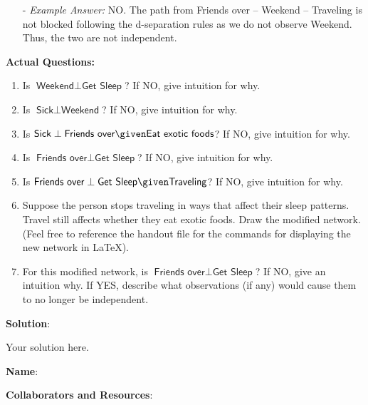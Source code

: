 \documentclass[submit]{../harvardml}
\newcommand{\attr}[1]{\textsf{#1}}
\newenvironment{solution}{
    \vspace{2mm}
    \color{blue}\noindent\textbf{Solution}:
}{}
\begin{document}
\begin{problem}
\begin{itemize}
    \item[-] \textit{Example Answer:} NO. The path from Friends over -- Weekend -- Traveling is not blocked following the d-separation rules as we do not observe Weekend. Thus, the two are not independent. 
  \end{itemize}

  \noindent \textbf{Actual Questions:}

  \begin{enumerate}
    \item Is $\attr{Weekend} \perp \attr{Get Sleep}$?
      If NO, give intuition for why.

    \item Is $\attr{Sick} \perp \attr{Weekend}$?
      If NO, give intuition for why.

    \item Is $\attr{Sick} \perp \attr{Friends over}\given \attr{Eat exotic
      foods}$? If NO, give intuition for why.

    \item Is $\attr{Friends over} \perp \attr{Get Sleep}$? If NO, give
      intuition for why.

    \item Is $\attr{Friends over} \perp \attr{Get Sleep} \given
      \attr{Traveling}$? If NO, give intuition for why.

    \item Suppose the person stops traveling in ways that affect their
      sleep patterns.  Travel still
      affects whether they eat exotic foods.  Draw the modified network. (Feel free to reference the handout file for the commands for displaying the new network in \LaTeX).

    \item For this modified network, is $\attr{Friends over} \perp
      \attr{Get Sleep}$? If NO, give an intuition why.  If YES,
      describe what observations (if any) would cause them to no longer be
      independent.
  \end{enumerate}
\end{problem}

\begin{solution}
	Your solution here.
\end{solution}

\newpage

\textbf{Name}:

\textbf{Collaborators and Resources}: 
\end{document}
